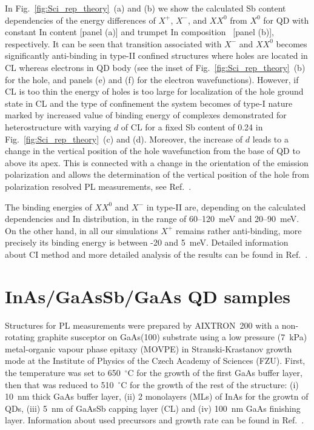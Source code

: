 In Fig.~\ref{fig:Sci_rep_theory}~(a) and (b) we show the calculated Sb content dependencies of the energy differences of $X^+$, $X^-$, and $XX^0$ from $X^0$ for QD with constant In content [panel (a)] and trumpet In composition~\cite{Migliorato} [panel (b)], respectively. It can be seen that transition associated with $X^-$ and $XX^0$ becomes significantly anti-binding in type-II confined structures where holes are located in CL whereas electrons in QD body (see the inset of Fig.~\ref{fig:Sci_rep_theory}~(b) for the hole, and panels (e) and (f) for the electron wavefunctions). However, if CL is too thin the energy of holes is too large for localization of the hole ground state in CL and the type of confinement the system becomes of type-I nature marked by increased value of binding energy of complexes demonstrated for heterostructure with varying $d$ of CL for a fixed Sb content of 0.24 in Fig.~\ref{fig:Sci_rep_theory}~(c) and (d). Moreover, the increase of $d$ leads to a change in the vertical position of the hole wavefunction from the base of QD to above its apex. This is connected with a change in the orientation of the emission polarization and allows the determination of the vertical position of the hole from polarization resolved PL measurements, see Ref.~\citep{Klenovsky2016}. 

The binding energies of $XX^0$ and $X^-$ in type-II are, depending on the calculated dependencies and In distribution, in the range of 60--120~meV and 20--90~meV. On the other hand, in all our simulations $X^+$ remains rather anti-binding, more precisely its binding energy is between -20 and 5~meV. Detailed information about CI method and more detailed analysis of the results can be found in Ref.~\citep{Klenovsky2017}.


\section{InAs/GaAsSb/GaAs QD samples}

Structures for PL measurements were prepared by AIXTRON~200 with a non-rotating graphite susceptor on GaAs(100) substrate using a low pressure (7~kPa) metal-organic vapour phase epitaxy (MOVPE) in Stranski-Krastanov growth mode at the Institute of Physics of the Czech Academy of Sciences (FZU). First, the temperature was set to 650~$^\circ$C for the growth of the first GaAs buffer layer, then that was reduced to 510~$^\circ$C for the growth of the rest of the structure: (i) 10~nm thick GaAs buffer layer, (ii) 2 monolayers (MLs) of InAs for the growtn of QDs, (iii) 5~nm of GaAsSb capping layer (CL) and (iv) 100~nm GaAs finishing layer. Information about used precursors and growth rate can be found in Ref.~\citep{Klenovsky2016}.

